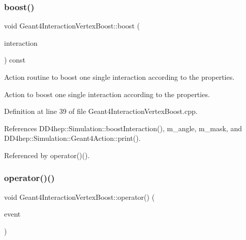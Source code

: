 \subsubsection{\texorpdfstring{boost()}{boost()}}
{\footnotesize\ttfamily void Geant4\+Interaction\+Vertex\+Boost\+::boost (\begin{DoxyParamCaption}\item[{\hyperlink{class_d_d4hep_1_1_simulation_1_1_geant4_interaction_vertex_boost_a24539ccb7908e132acaf99eeec5111e5}{Interaction} $\ast$}]{interaction }\end{DoxyParamCaption}) const\hspace{0.3cm}{\ttfamily [protected]}}



Action routine to boost one single interaction according to the properties. 

Action to boost one single interaction according to the properties. 

Definition at line 39 of file Geant4\+Interaction\+Vertex\+Boost.\+cpp.



References D\+D4hep\+::\+Simulation\+::boost\+Interaction(), m\+\_\+angle, m\+\_\+mask, and D\+D4hep\+::\+Simulation\+::\+Geant4\+Action\+::print().



Referenced by operator()().

\hypertarget{class_d_d4hep_1_1_simulation_1_1_geant4_interaction_vertex_boost_ab66ab43b06523e720a1e377ecd065a66}{}\label{class_d_d4hep_1_1_simulation_1_1_geant4_interaction_vertex_boost_ab66ab43b06523e720a1e377ecd065a66} 
\subsubsection{\texorpdfstring{operator()()}{operator()()}}
{\footnotesize\ttfamily void Geant4\+Interaction\+Vertex\+Boost\+::operator() (\begin{DoxyParamCaption}\item[{G4\+Event $\ast$}]{event }\end{DoxyParamCaption})\hspace{0.3cm}{\ttfamily [virtual]}}



